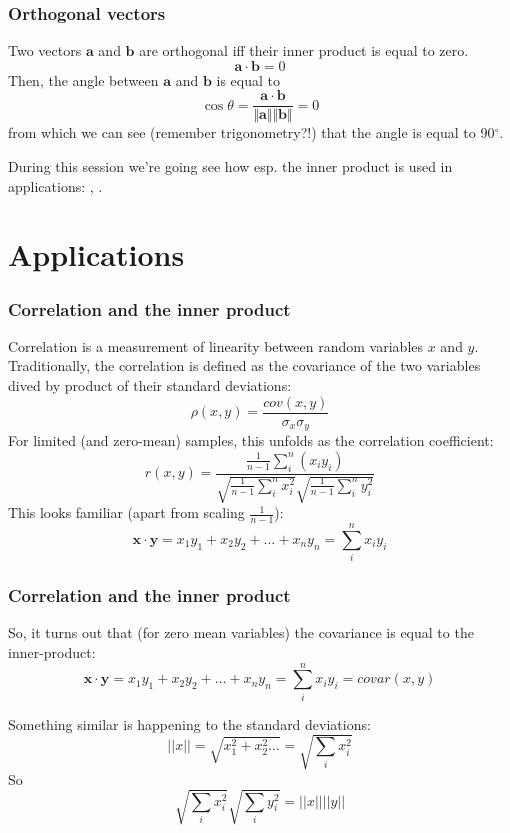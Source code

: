 \documentclass{beamer}
\begin{document}
\begin{frame}
\frametitle{Orthogonal vectors}
Two vectors $\mathbf{a}$ and $\mathbf{b}$ are orthogonal iff their inner product is equal to zero.
$$\mathbf{a} \cdot  \mathbf{b} = 0 $$
Then, the angle between $\mathbf{a}$ and $\mathbf{b}$ is equal to
$$ \cos\theta =\frac{\mathbf{a} \cdot \mathbf{b}}{\Vert \mathbf{a}\Vert  \Vert \mathbf{b} \Vert} = 0$$ from which we can see (remember trigonometry?!) that the angle is equal to 90$^{\circ}$. 

During this session we're going see how esp. the inner product is used in applications: {}  ,  {}.
\end{frame}

\section{Applications}
\begin{frame}
\frametitle{Correlation and the inner product}
Correlation is a measurement of linearity between random variables $x$ and $y$.
Traditionally, the correlation is defined as the covariance of the two variables dived by product of their standard deviations:
$$\rho(x,y) = \frac{cov(x,y)}{\sigma_x\sigma_y}$$
For limited (and zero-mean) samples, this unfolds as the correlation coefficient:
$$r(x,y) = \frac{ \frac{1}{n-1} \sum_i^n (x_i y_i)}
{\sqrt{\frac{1}{n-1}\sum_i^n x_i^2 } \sqrt{\frac{1}{n-1}\sum_i^n y_i^2}}$$
This looks familiar (apart from scaling $\frac{1}{n-1}$):
$$\mathbf{x} \cdot  \mathbf{y} = x_1 y_1 + x_2 y_2 + \ldots +  x_n y_n = \sum_i^n x_i y_i$$
\end{frame}

\begin{frame}
\frametitle{Correlation and the inner product}
So, it turns out that (for zero mean variables) the covariance is equal to the inner-product:
$$\mathbf{x} \cdot  \mathbf{y} = x_1 y_1 + x_2 y_2 + \ldots + x_n y_n= \sum_i^n x_i y_i = covar(x,y)$$

Something similar is happening to the standard deviations:
$$||x|| = \sqrt{x_1^2 + x_2^2 \ldots}  = \sqrt{\sum_i x_i^2}$$
So 
$$\sqrt{\sum_ix_i^2} \sqrt{\sum_iy_i^2} = ||x|| ||y||$$
\end{frame}
\end{document}
